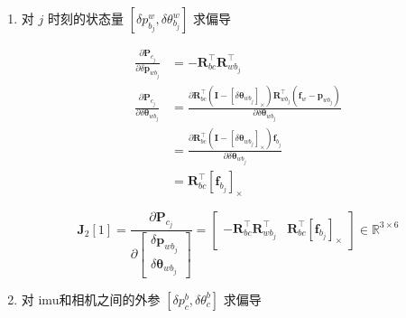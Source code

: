 \documentclass[12pt,a4paper]{article}
\begin{document}
\begin{enumerate}
\begin{enumerate}
\item 对 {\color{blue} $j$ 时刻的状态量 $[\delta p^{w}_{b_{j}},\delta \theta ^{w}_{b_{j}}]$} 求偏导

\begin{equation}
\begin{aligned}
\frac{\partial \mathbf{P}_{c_{j}}}{\partial \delta \mathbf{p}_{w b_{j}}} 
&=
-\mathbf{R}_{b c}^{\top} \mathbf{R}_{w b_{j}}^{\top} 
\\
\frac{\partial \mathbf{P}_{c_{j}}}{\partial \delta \boldsymbol{\theta}_{w b_{j}}} 
&=
\frac{\partial \mathbf{R}_{b c}^{\top}\left(\mathbf{I}-\left[\delta \boldsymbol{\theta}_{w b_{j}}\right]_{\times}\right) \mathbf{R}_{w b_{j}}^{\top}\left(\mathbf{f}_{w}-\mathbf{p}_{w b_{j}}\right)}
{\partial \delta \boldsymbol{\theta}_{w b_{j}}} \\
&=
\frac{\partial \mathbf{R}_{b c}^{\top}\left(\mathbf{I}-\left[\delta \boldsymbol{\theta}_{w b_{j}}\right]_{\times}\right) \mathbf{f}_{b_{j}}}
{\partial \delta \boldsymbol{\theta}_{w b_{j}}} \\
&=
\mathbf{R}_{b c}^{\top}\left[\mathbf{f}_{b_{j}}\right]_{\times}
\end{aligned}
\end{equation}

\begin{equation}
\mathbf{J}_2[1]
=
\frac{\partial \mathbf{P}_{c_{j}}}
{\partial \left[\begin{array}{c}{\delta \mathbf{p}_{w b_{j}}} \\ 
{\delta \boldsymbol{\theta}_{w b_{j}}}\end{array}\right]} 
=
\begin{bmatrix}
-\mathbf{R}_{b c}^{\top} \mathbf{R}_{w b_{j}}^{\top} 
& 
\mathbf{R}_{b c}^{\top}\left[\mathbf{f}_{b_{j}}\right]_{\times}
\end{bmatrix}
\in \mathbb{R}^{3 \times 6}
\end{equation}

\item 对 {\color{blue}imu和相机之间的外参 $[\delta p^{b}_{c},\delta \theta ^{b}_{c}]$} 求偏导


\end{enumerate}
\end{enumerate}
\end{document}
